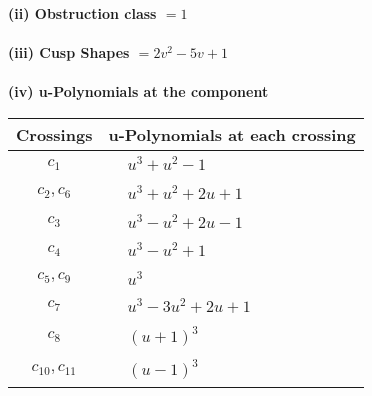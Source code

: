 \documentclass[1p]{elsarticle_modified}
\theoremstyle{definition}
\begin{document}
\flushleft \textbf{(ii) Obstruction class $= 1$}\\~\\
\flushleft \textbf{(iii) Cusp Shapes $= 2 v^2-5 v+1$}\\~\\
\newpage\renewcommand{\arraystretch}{1}
\flushleft \textbf{(iv) u-Polynomials at the component}\newline \\
\begin{tabular}{m{50pt}|m{274pt}}
Crossings & \hspace{64pt}u-Polynomials at each crossing \\
\hline $$\begin{aligned}c_{1}\end{aligned}$$&$\begin{aligned}
&u^3+u^2-1
\end{aligned}$\\
\hline $$\begin{aligned}c_{2},c_{6}\end{aligned}$$&$\begin{aligned}
&u^3+u^2+2 u+1
\end{aligned}$\\
\hline $$\begin{aligned}c_{3}\end{aligned}$$&$\begin{aligned}
&u^3- u^2+2 u-1
\end{aligned}$\\
\hline $$\begin{aligned}c_{4}\end{aligned}$$&$\begin{aligned}
&u^3- u^2+1
\end{aligned}$\\
\hline $$\begin{aligned}c_{5},c_{9}\end{aligned}$$&$\begin{aligned}
&u^3
\end{aligned}$\\
\hline $$\begin{aligned}c_{7}\end{aligned}$$&$\begin{aligned}
&u^3-3 u^2+2 u+1
\end{aligned}$\\
\hline $$\begin{aligned}c_{8}\end{aligned}$$&$\begin{aligned}
&(u+1)^3
\end{aligned}$\\
\hline $$\begin{aligned}c_{10},c_{11}\end{aligned}$$&$\begin{aligned}
&(u-1)^3
\end{aligned}$\\
\hline
\end{tabular}\\~\\
\end{document}
